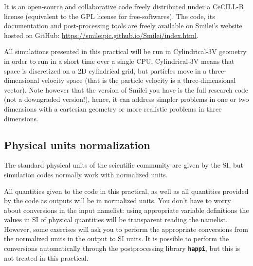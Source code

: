 \documentclass{article}
\newcommand{\smilei}{{\sc Smilei}\xspace}
\newcommand{\commandline}[1]{\texttt{\textbf{#1}}}
\begin{document}
It is an open-source and collaborative code freely distributed under a CeCILL-B license (equivalent to the GPL license for free-softwares).
The code, its documentation and post-processing tools are freely available on \smilei's website hosted on GitHub: \url{https://smileipic.github.io/Smilei/index.html}.

All simulations presented in this practical will be run in Cylindrical-3V geometry in order to run in a short time over a single CPU.
Cylindrical-3V means that space is discretized on a 2D cylindrical grid, but particles move in a three-dimensional velocity space (that is the particle velocity is a three-dimensional vector). Note however that the version of \smilei you have is the full research code (not a downgraded version!), hence, it can address simpler problems in one or two dimensions with a cartesian geometry or more realistic problems in three dimensions.


\subsection*{Physical units normalization} The standard physical units of the scientific community are given by the SI,  but simulation codes normally  work with normalized units. 

All quantities given to the code in this practical, as well as all quantities provided by the code as outputs will be in normalized units.
You don't have to worry about conversions in the input namelist: using appropriate variable definitions the values in SI of physical quantities will be transparent reading the namelist.
However, some exercises will ask you to perform the appropriate conversions from the normalized units in the output to SI units.  It is possible to perform the conversions automatically through the postprocessing library \commandline{happi},  but this is not treated in this practical.
\end{document}
